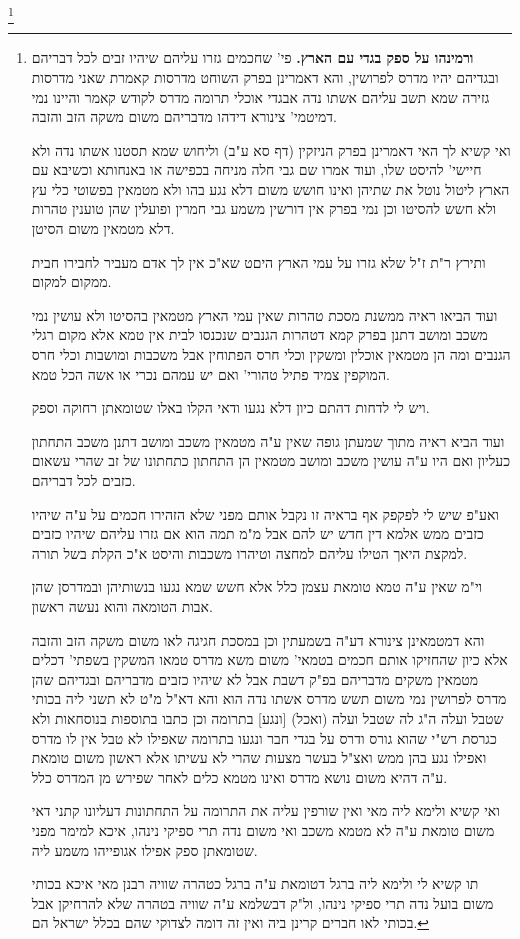 \documentclass[12pt, openany]{book}
\newcommand{\footnotecomment}[1]{
	\renewcommand\thefootnote{}
	\footnote{#1}}
\newcommand{\commenta}[1]{\footnotecomment{#1}}
\begin{document}
{\commenta{\textbf{ורמינהו על ספק בגדי עם הארץ.} פי' שחכמים גזרו עליהם שיהיו זבים לכל דבריהם ובגדיהם יהיו מדרס לפרושין, והא דאמרינן בפרק השוחט מדרסות קאמרת שאני מדרסות גזירה שמא תשב עליהם אשתו נדה אבגדי אוכלי תרומה מדרס לקודש קאמר והיינו נמי דמיטמי' צינורא דידהו מדבריהם משום משקה הזב והזבה.\par ואי קשיא לך האי דאמרינן בפרק הניזקין (דף סא ע"ב) וליחוש שמא תסטנו אשתו נדה ולא חיישי' להיסט שלו, ועוד אמרו שם גבי חלה מניחה בכפישה או באנחותא וכשיבא עם הארץ ליטול נוטל את שתיהן ואינו חושש משום דלא נגע בהו ולא מטמאין בפשוטי כלי עץ ולא חשש להסיטו וכן נמי בפרק אין דורשין משמע גבי חמרין ופועלין שהן טוענין טהרות דלא מטמאין משום הסיטן.\par ותירץ ר"ת ז"ל שלא גזרו על עמי הארץ היםט שא"כ אין לך אדם מעביר לחבירו חבית ממקום למקום.\par ועוד הביאו ראיה ממשנת מסכת טהרות שאין עמי הארץ מטמאין בהסיטו ולא עושין נמי משכב ומושב דתנן בפרק קמא דטהרות הגנבים שנכנסו לבית אין טמא אלא מקום רגלי הגנבים ומה הן מטמאין אוכלין ומשקין וכלי חרס הפתוחין אבל משכבות ומושבות וכלי חרס המוקפין צמיד פתיל טהורי' ואם יש עמהם נכרי או אשה הכל טמא.\par ויש לי לדחות דהתם כיון דלא נגעו ודאי הקלו באלו שטומאתן רחוקה וספק.\par ועוד הביא ראיה מתוך שמעתן גופה שאין ע"ה מטמאין משכב ומושב דתנן משכב התחתון כעליון ואם היו ע"ה עושין משכב ומושב מטמאין הן התחתון כתחתונו של זב שהרי עשאום כזבים לכל דבריהם.\par ואע"פ שיש לי לפקפק אף בראיה זו נקבל אותם מפני שלא הזהירו חכמים על ע"ה שיהיו כזבים ממש אלמא דין חדש יש להם אבל מ"מ תמה הוא אם גזרו עליהם שיהיו כזבים למקצת היאך הטילו עליהם למחצה וטיהרו משכבות והיסט א"כ הקלת בשל תורה.\par וי"מ שאין ע"ה טמא טומאת עצמן כלל אלא חשש שמא נגעו בנשותיהן ובמדרסן שהן אבות הטומאה והוא נעשה ראשון.\par והא דמטמאינן צינורא דע"ה בשמעתין וכן במסכת חגיגה לאו משום משקה הזב והזבה אלא כיון שהחזיקו אותם חכמים בטמאי' משום משא מדרס טמאו המשקין בשפתי' דכלים מטמאין משקים מדבריהם בפ"ק דשבת אבל לא שיהיו כזבים מדבריהם ובגדיהם שהן מדרס לפרושין נמי משום תשש מדרס אשתו נדה הוא והא דא"ל מ"ט לא תשני ליה בכותי שטבל ועלה ה"ג לה שטבל ועלה (ואכל) [ונגע] בתרומה וכן כתבו בתוספות בנוסחאות ולא כגרסת רש"י שהוא גורס ודרס על בגדי חבר ונגעו בתרומה שאפילו לא טבל אין לו מדרס ואפילו נגע בהן ממש ואצ"ל בעשר מצעות שהרי לא עשיתו אלא ראשון משום טומאת ע"ה דהיא משום נושא מדרס ואינו מטמא כלים לאחר שפירש מן המדרס כלל.\par ואי קשיא ולימא ליה מאי ואין שורפין עליה את התרומה על התחתונות דעליונו קתני דאי משום טומאת ע"ה לא מטמא משכב ואי משום נדה תרי ספיקי נינהו, איכא למימר מפני שטומאתן ספק אפילו אגופייהו משמע ליה.\par תו קשיא לי ולימא ליה ברגל דטומאת ע"ה ברגל כטהרה שוויה רבנן מאי איכא בכותי משום בועל נדה תרי ספיקי נינהו, ול"ק דבשלמא ע"ה שוויה בטהרה שלא להרחיקן אבל בכותי לאו חברים קרינן ביה ואין זה דומה לצדוקי שהם בכלל ישראל הם. }
}
\end{document}

